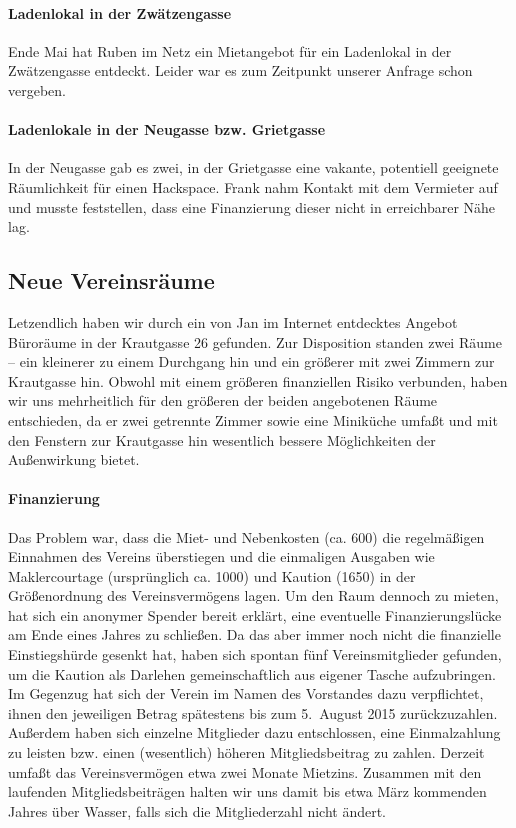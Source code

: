 \documentclass[10pt,DIV16]{scrartcl}
\begin{document}
\paragraph{Ladenlokal in der Zwätzengasse}

Ende Mai hat Ruben im Netz ein Mietangebot für ein Ladenlokal in der
Zwätzengasse entdeckt.  Leider war es zum Zeitpunkt unserer Anfrage schon
vergeben.

\paragraph{Ladenlokale in der Neugasse bzw. Grietgasse}

In der Neugasse gab es zwei, in der Grietgasse eine vakante,
potentiell geeignete Räumlichkeit für einen Hackspace. Frank nahm
Kontakt mit dem Vermieter auf und musste feststellen, dass eine
Finanzierung dieser nicht in erreichbarer Nähe lag.

\subsection{Neue Vereinsräume}

Letzendlich haben wir durch ein von Jan im Internet entdecktes 
Angebot Büroräume in der Krautgasse 26 gefunden.  Zur Disposition 
standen zwei Räume -- ein kleinerer zu einem Durchgang hin und ein 
größerer mit zwei Zimmern zur Krautgasse hin.  Obwohl mit einem 
größeren finanziellen Risiko verbunden, haben wir uns mehrheitlich 
für den größeren der beiden angebotenen Räume entschieden, da er 
zwei getrennte Zimmer sowie eine Miniküche umfaßt und mit den 
Fenstern zur Krautgasse hin wesentlich bessere Möglichkeiten der 
Außenwirkung bietet.

\paragraph{Finanzierung}
\label{sec:krautspace_kaution}

Das Problem war, dass die Miet- und Nebenkosten (ca. 600\EUR) die 
regelmäßigen Einnahmen des Vereins überstiegen und die einmaligen 
Ausgaben wie Maklercourtage (ursprünglich ca. 1000\EUR) und Kaution 
(1650\EUR) in der Größenordnung des Vereinsvermögens lagen.  Um den 
Raum dennoch zu mieten, hat sich ein anonymer Spender bereit 
erklärt, eine eventuelle Finanzierungslücke am Ende eines Jahres zu 
schließen.  Da das aber immer noch nicht die finanzielle 
Einstiegshürde gesenkt hat, haben sich spontan fünf 
Vereinsmitglieder gefunden, um die Kaution als Darlehen 
gemeinschaftlich aus eigener Tasche aufzubringen.  Im Gegenzug hat 
sich der Verein im Namen des Vorstandes dazu verpflichtet, ihnen den 
jeweiligen Betrag spätestens bis zum 5.\ August 2015 
zurückzuzahlen.  Außerdem haben sich einzelne Mitglieder dazu 
entschlossen, eine Einmalzahlung zu leisten bzw. einen (wesentlich) 
höheren Mitgliedsbeitrag zu zahlen.  Derzeit umfaßt das 
Vereinsvermögen etwa zwei Monate Mietzins. Zusammen mit den 
laufenden Mitgliedsbeiträgen halten wir uns damit bis etwa März 
kommenden Jahres über Wasser, falls sich die Mitgliederzahl nicht 
ändert.
\end{document}
